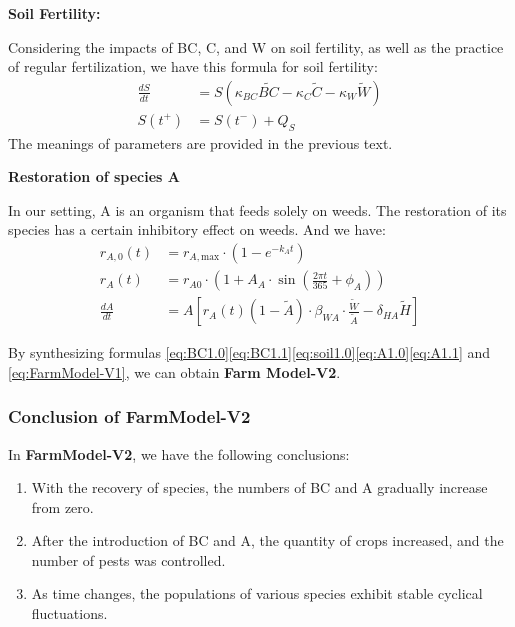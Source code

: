 \documentclass[12pt]{article}  %
\begin{document}
\noindent\textbf{Soil Fertility:} 

Considering the impacts of BC, C, and W on soil fertility, as well as the practice of regular fertilization, 
we have this formula for soil fertility:
\begin{equation}
    \begin{aligned}
        \frac{dS}{dt} &= S(\kappa_{BC} \tilde{BC} -\kappa_C \tilde{C} - \kappa_W \tilde{W} )\\
        S(t^+) &= S(t^-) + Q_S
    \end{aligned}\label{eq:soil1.0}
\end{equation}
The meanings of parameters are provided in the previous text.

\noindent\textbf{Restoration of species A}

In our setting, A is an organism that feeds solely on weeds. 
The restoration of its species has a certain inhibitory effect on weeds.
And we have:
\begin{align}
    r_{A,0}(t) &= r_{A,\text{max}} \cdot \left(1 - e^{-k_A t}\right)\\
    r_A(t) &= r_{A0} \cdot \left(1 + A_A \cdot \sin\left(\frac{2\pi t}{365} + \phi_A\right)\right) \label{eq:A1.0} \\
    \frac{dA}{dt} &= A \left[ r_A(t) \left( 1 - \tilde{A} \right) \cdot \beta_{WA} \cdot \frac{\tilde{W}}{\tilde{A}} - \delta_{HA} \tilde{H} \right]\label{eq:A1.1}
\end{align}

By synthesizing formulas \eqref{eq:BC1.0}\eqref{eq:BC1.1}\eqref{eq:soil1.0}\eqref{eq:A1.0}\eqref{eq:A1.1} and \eqref{eq:FarmModel-V1}, we can obtain \textbf{Farm
Model-V2}.

\subsubsection{Conclusion of FarmModel-V2}
In \textbf{FarmModel-V2}, we have the following conclusions:

\begin{enumerate}
    \item With the recovery of species, the numbers of BC 
    and A gradually increase from zero.
    \item After the introduction of BC and A, the 
    quantity of crops increased, and the number of 
    pests was controlled.
    \item As time changes, the populations of various 
    species exhibit stable cyclical fluctuations.
\end{enumerate}
\end{document}
